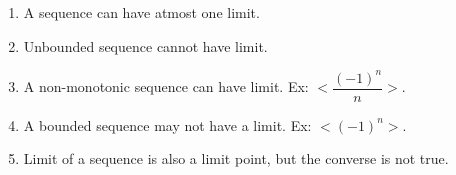\documentclass[a4paper]{article}
\begin{document}
\begin{description}
\begin{itemize}
\begin{enumerate}
                \item A sequence can have atmost one limit.
                \item Unbounded sequence cannot have limit. 
                \item A non-monotonic sequence can have limit. Ex: 
                $<\dfrac{(-1)^n}{n}>$.
                \item A bounded sequence may not have a limit. Ex: $<(-1)^n>$.
                \item Limit of a sequence is also a limit point, 
                but the converse is not true.
            \end{enumerate}
    \end{itemize}
\end{description}
\end{document}
